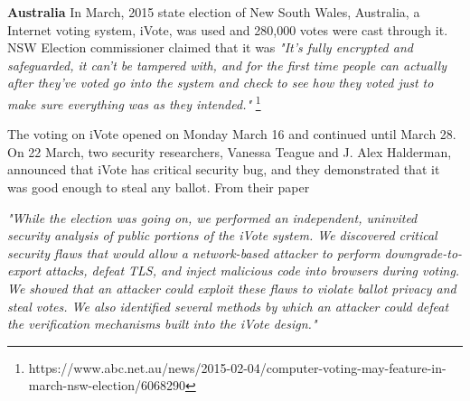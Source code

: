 %  

 \textbf{Australia}
  In March, 2015 state election 
  of New South Wales, Australia, a Internet voting system, iVote,    
  was used and 280,000 votes were cast through it. NSW Election 
  commissioner claimed that it was 
 \textit{
 "It's fully encrypted and safeguarded, it can't be tampered with, 
 and for the first time people can actually after they've voted 
 go into the system and check to see how they voted just to make 
 sure everything was as they intended." }
 \footnote{https://www.abc.net.au/news/2015-02-04/computer-voting-may-feature-in-march-nsw-election/6068290} 

  \noindent
  The voting on iVote 
  opened on Monday March 16 and continued until March 28. On 22 March,
  two security researchers, Vanessa Teague and J. Alex Halderman, 
  announced that iVote has critical security bug, and they demonstrated 
  that it was good enough to steal any ballot. From their paper
  \citep{10.1007/978-3-319-22270-7_3}
  
  \textit{ 
  "While the election was going on, we performed an independent,
   uninvited security analysis of public portions of the iVote 
   system. We discovered critical security flaws that would allow
   a network-based attacker to perform downgrade-to-export 
   attacks, defeat TLS, and inject malicious code 
   into browsers during voting. We showed that an attacker could
   exploit these flaws to violate ballot privacy and steal votes. 
   We also identified several methods by which an attacker could
   defeat the verification mechanisms built into the iVote design." }
  
